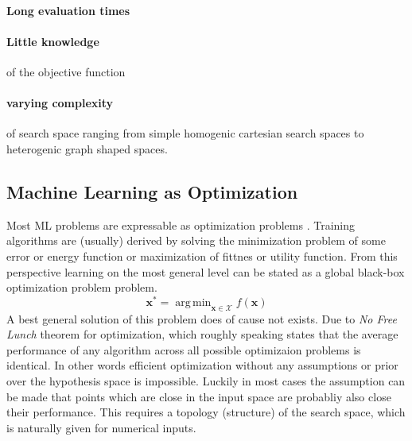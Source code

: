 \documentclass[english]{article}
\DeclareMathOperator*{\argmin}{arg\,min}
\begin{document}
\paragraph{Long evaluation times}
\paragraph{Little knowledge} of the objective function
\paragraph{varying complexity} of search space ranging from simple homogenic cartesian search spaces to heterogenic graph shaped spaces.

\subsection{Machine Learning as Optimization}
Most \acf{ML} problems are expressable as optimization problems \cite{bennett_interplay_2006}. Training algorithms are (usually) derived by solving the minimization problem of some error or energy function or maximization of fittnes or utility function. From this perspective learning on the most general level can be stated as a global black-box optimization problem problem.
$$\mathbf{x^*} = \argmin_{\mathbf{x}\in \mathcal{X}} f(\mathbf{x})$$
A best general solution of this problem does of cause not exists. Due to \textit{No Free Lunch} theorem for optimization, which roughly speaking states that the average performance of any algorithm across all possible optimizaion problems is identical. In other words efficient optimization without any assumptions or prior over the hypothesis space is impossible. Luckily in most cases the assumption can be made that points which are close in the input space are probabliy also close their performance. This requires a topology (structure) of the search space, which is naturally given for numerical inputs.
\end{document}
